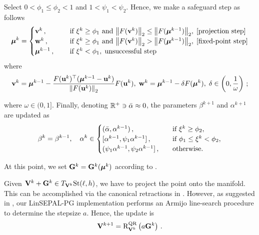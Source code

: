 Select $0<\phi_1\leq\phi_2<1$ and $1<\psi_1<\psi_2$.
Hence, we make a safeguard step as follows
\begin{equation}\label{eq:safeguard_step}
    \boldsymbol{\mu}^{k} = \begin{cases}
        \mathbf{v}^k\,, &\quad \text{ if } \xi^k \geq \phi_1 \text{ and } \norm{F(\mathbf{v}^k)}_2 \leq \norm{F(\boldsymbol{\mu}^{k-1})}_2, \;  \text{[projection step]} \\
        \mathbf{w}^k\,, &\quad \text{ if } \xi^k \geq \phi_1 \text{ and } \norm{F(\mathbf{v}^k)}_2 > \norm{F(\boldsymbol{\mu}^{k-1})}_2, \;  \text{[fixed-point step]} \\
        \boldsymbol{\mu}^{k-1}\,, &\quad \text{ if } \xi^k < \phi_1, \; \text{unsuccessful step}
    \end{cases}
\end{equation}
where
\begin{equation}
    \mathbf{v}^k = \boldsymbol{\mu}^{k-1} - \frac{F(\mathbf{u}^k)^\top (\boldsymbol{\mu}^{k-1} - \mathbf{u}^k)}{\norm{F(\mathbf{u}^k)}_2} F(\mathbf{u}^k), \; \mathbf{w}^k=\boldsymbol{\mu}^{k-1} - \delta F(\boldsymbol{\mu}^k), \; \delta \in \left(0, \frac{1}{\omega}\right)\,;
\end{equation}

where $\omega \in (0,1]$. 
Finally, denoting $\mathbb{R}^+ \ni \Bar{\alpha} \approx 0$, the parameters $\beta^{k+1}$ and $\alpha^{k+1}$ are updated as
\begin{equation}
    \beta^{k}=\beta^{k-1}, \quad \alpha^{k} \in \begin{cases}
        (\Bar{\alpha}, \alpha^{k-1})\,, &\quad \text{if } \xi^k \geq \phi_2,\\
        [\alpha^{k-1}, \psi_1\alpha^{k-1}]\,, &\quad \text{if } \phi_1 \leq \xi^k < \phi_2,\\
        (\psi_1\alpha^{k-1}, \psi_2\alpha^{k-1}]\,, &\quad \text{otherwise.}\\
    \end{cases}
\end{equation}

At this point, we set $\mathbf{G}^k=\mathbf{G}^k(\boldsymbol{\mu}^k)$ according to .

Given $\mathbf{V}^k + \mathbf{G}^k \in T_{\mathbf{V}^k}{\mathrm{St}({\ell},{h})}$, we have to project the point onto the manifold.
This can be accomplished via the canonical retractions in .
However, as suggested in , our LinSEPAL-PG implementation performs an Armijo line-search procedure to determine the stepsize $a$.
Hence, the update is
\begin{equation}\label{eq:updateV_linsepalpg}
    \mathbf{V}^{k+1}=\mathrm{R}^{\mathrm{QR}}_{\mathbf{V}^k}\left( a\mathbf{G}^k \right)\,.
\end{equation}

